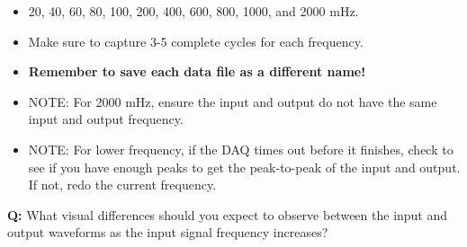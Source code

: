 \documentclass{article} %
\begin{document}
\begin{enumerate}
    \begin{itemize}
        \item 20, 40, 60, 80, 100, 200, 400, 600, 800, 1000, and 2000 mHz. 
        \item Make sure to capture 3-5 complete cycles for each frequency. 
        \item \textbf{Remember to save each data file as a different name!}
        \item NOTE: For 2000 mHz, ensure the input and output do not have the same input and output frequency.
        \item NOTE: For lower frequency, if the DAQ times out before it finishes, check to see if you have enough peaks to get the peak-to-peak of the input and output. If not, redo the current frequency.
    \end{itemize}
\end{enumerate}

\textbf{Q:} What visual differences should you expect to observe between the input and output waveforms as the input signal frequency increases?
\end{document}
